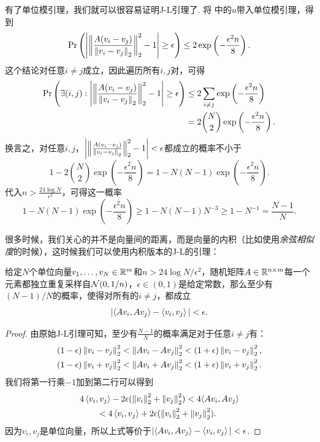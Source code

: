 有了单位模引理，我们就可以很容易证明J-L引理了. 将 中的$u$带入单位模引理，得到
\[
    \Pr\left(\left|\left\|\frac{A(v_i-v_j)}{\left\|v_i-v_j\right\|_2}\right\|_2^2 - 1 \right| \geq \epsilon\right)\leq  2\exp \left(-\frac{\epsilon^2 n}{8}\right). 
\]
这个结论对任意$i\neq j$成立，因此遍历所有$i,j$对，可得
\[
\begin{aligned}
    \Pr\left(\exists (i,j): \left|\left\|\frac{A(v_i-v_j)}{\left\|v_i-v_j\right\|_2}\right\|_2^2 - 1 \right| \geq \epsilon\right)
    &\leq 2 \sum_{i\neq j} \exp \left(-\frac{\epsilon^2 n}{8}\right) \\
    &=  2  \binom{N}{2}\exp \left(-\frac{\epsilon^2 n}{8}\right). 
\end{aligned}
\]
换言之，对任意$i,j$，$\left|\left\|\frac{A(v_i-v_j)}{\left\|v_i-v_j\right\|_2}\right\|_2^2 - 1 \right| < \epsilon$都成立的概率不小于
\[
1 - 2  \binom{N}{2}\exp \left(-\frac{\epsilon^2 n}{8}\right) = 1 - N(N-1)\exp \left(-\frac{\epsilon^2 n}{8}\right). 
\]
代入$n > \frac{24\log N}{\epsilon^2}$，可得这一概率
\[
1 - N(N-1)\exp \left(-\frac{\epsilon^2 n}{8}\right) \geq 1 - N(N-1)N^{-3}\geq 1 - N^{-1} = \frac{N-1}{N}. 
\]

很多时候，我们关心的并不是向量间的距离，而是向量的内积（比如使用\textit{余弦相似度}的时候），这时候我们可以使用内积版本的J-L的引理：
\begin{theorem}\label{thm:johnson-lindenstrauss-lemma-inner-product}
    给定$N$个单位向量$v_1,\dots,v_N\in\mathbb{R}^m$和$n > 24\log N/\epsilon^2$，随机矩阵$A\in \mathbb{R}^{n\times m}$每一个元素都独立重复采样自$\mathcal{N}(0,1/n)$，$\epsilon \in (0,1)$是给定常数，那么至少有$(N-1)/N$的概率，使得对所有的$i\neq j$，都成立
    \[
        |\langle Av_i, Av_j\rangle - \left\langle{v_i},{v_j}\right\rangle|< \epsilon.
    \]
\end{theorem}    
\begin{proof}
由原始J-L引理可知，至少有$\frac{N-1}{N}$的概率满足对于任意$i\neq j$有：
    \[
    \begin{aligned}
        &(1 - \epsilon)\left\|v_i-v_j\right\|_2^2 < \left\|Av_i-Av_j\right\|_2^2< (1 + \epsilon)\left\|v_i-v_j\right\|_2^2, \\
        &(1 - \epsilon)\left\|v_i+v_j\right\|_2^2 < \left\|Av_i+Av_j\right\|_2^2 < (1 + \epsilon)\left\|v_i+v_j\right\|_2^2. 
    \end{aligned}
    \]
我们将第一行乘$-1$加到第二行可以得到
\begin{align*}
    &4\left\langle{v_i},{v_j}\right\rangle - 2 \epsilon (\left\|v_i\right\|_2^2 + \left\|v_j\right\|_2^2) <4\langle Av_i, Av_j\rangle\\
    &\qquad< 4\left\langle{v_i},{v_j}\right\rangle + 2 \epsilon (\left\|v_i\right\|_2^2 + \left\|v_j\right\|_2^2).
\end{align*}
因为$v_i,v_j$是单位向量，所以上式等价于$|\langle Av_i, Av_j\rangle - \left\langle{v_i},{v_j}\right\rangle|<\epsilon$. 
\end{proof}

